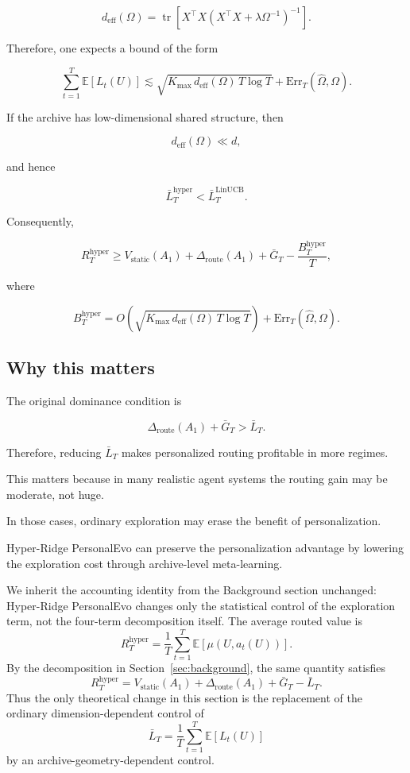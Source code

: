 \documentclass{article} %
\providecommand{\Rstatic}{V_{\mathrm{static}}}
\providecommand{\Droute}{\Delta_{\mathrm{route}}}
\providecommand{\deff}{d_{\mathrm{eff}}}
\providecommand{\Err}{\mathrm{Err}}
\providecommand{\Kmax}{K_{\max}}
\begin{document}
\[
\deff(\Omega)
= \operatorname{tr}\!\left[ X^\top X
  \left( X^\top X + \lambda \Omega^{-1} \right)^{-1} \right].
\]

Therefore, one expects a bound of the form

\[
\sum_{t=1}^{T} \mathbb{E}[L_t(U)]
\lesssim \sqrt{ \Kmax\, \deff(\Omega)\, T \log T }
+ \Err_T(\widehat{\Omega}, \Omega).
\]

If the archive has low-dimensional shared structure, then

\[
\deff(\Omega) \ll d,
\]

and hence

\[
\bar{L}_T^{\mathrm{hyper}} < \bar{L}_T^{\mathrm{LinUCB}}.
\]

Consequently,

\[
R_T^{\mathrm{hyper}}
\ge \Rstatic(A_1) + \Droute(A_1) + \bar{G}_T
- \frac{B_T^{\mathrm{hyper}}}{T},
\]

where

\[
B_T^{\mathrm{hyper}}
= O\!\left( \sqrt{ \Kmax\, \deff(\Omega)\, T \log T } \right)
+ \Err_T(\widehat{\Omega}, \Omega).
\]

\subsection{Why this matters}

The original dominance condition is

\[
\Droute(A_1) + \bar{G}_T > \bar{L}_T .
\]

Therefore, reducing $\bar{L}_T$ makes personalized routing profitable in more
regimes.

This matters because in many realistic agent systems the routing gain may be
moderate, not huge.

In those cases, ordinary exploration may erase the benefit
of personalization.

Hyper-Ridge PersonalEvo can preserve the personalization
advantage by lowering the exploration cost through archive-level
meta-learning.




We inherit the accounting identity from the Background section unchanged: Hyper-Ridge PersonalEvo changes only the statistical control of the exploration term, not the four-term decomposition itself. The average routed value is
\begin{equation}
\label{eq:hyper-routed-value}
R_T^{\mathrm{hyper}}
=
\frac{1}{T}\sum_{t=1}^{T}
\mathbb{E}\!\left[\mu(U,a_t(U))\right].
\end{equation}
By the decomposition in Section~\ref{sec:background}, the same quantity satisfies
\begin{equation}
\label{eq:hyper-inherited-decomp}
R_T^{\mathrm{hyper}}
=
V_{\mathrm{static}}(A_1)
+
\Delta_{\mathrm{route}}(A_1)
+
\bar G_T
-
\bar L_T.
\end{equation}
Thus the only theoretical change in this section is the replacement of the ordinary dimension-dependent control of
\begin{equation}
\label{eq:hyper-barl}
\bar L_T
=
\frac{1}{T}\sum_{t=1}^{T}\mathbb{E}[L_t(U)]
\end{equation}
by an archive-geometry-dependent control.
\end{document}
